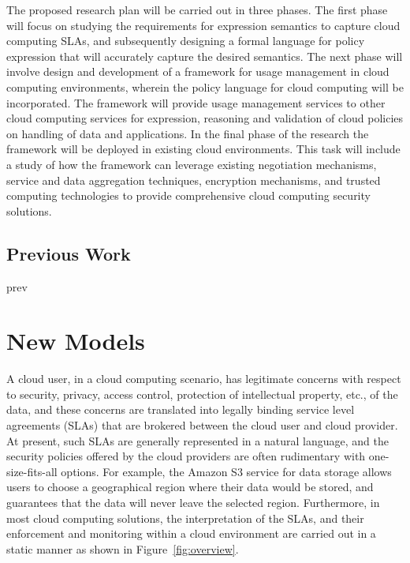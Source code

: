 \documentclass[10pt, conference, compsocconf]{IEEEtran}
\begin{document}
The proposed research plan will be carried out in three phases. The first phase will focus on studying the requirements for expression semantics to capture cloud computing SLAs, and subsequently  designing a formal language for policy expression that will accurately capture the desired semantics. The next phase will involve design and development of a framework for usage management in cloud computing environments, wherein the policy language for cloud computing will be incorporated. The framework will provide usage management services to other cloud computing services for expression, reasoning and validation of cloud policies on handling of data and applications. In the final phase of the research the framework will be deployed in existing cloud environments. This task will include a study of how the framework can leverage existing negotiation mechanisms, service and data aggregation techniques, encryption mechanisms, and  trusted computing technologies  to provide comprehensive cloud computing security solutions. 

\subsection{Previous Work}
prev

\section{New Models}
A cloud user, in a cloud computing scenario, has legitimate concerns with respect to security, privacy, access control, protection of intellectual property, etc., of the data, and these concerns are translated into legally binding service level agreements (SLAs) that are brokered between the cloud user and cloud provider. At present, such SLAs are generally represented in a natural language, and the security policies offered by the cloud providers are often rudimentary with one-size-fits-all options. For example, the Amazon S3 service for data storage allows users to choose a geographical region where their data would be stored, and guarantees that the data will never leave the selected region. Furthermore, in most cloud computing solutions, the interpretation of the SLAs, and their enforcement and monitoring within a cloud environment are carried out in a static manner as shown in Figure~\ref{fig:overview}.
\end{document}
